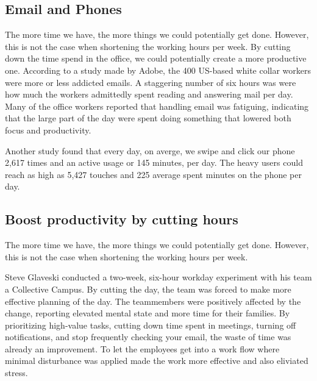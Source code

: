 \documentclass[12pt, a4paper]{article}
\begin{document}
    \subsection{Email and Phones}
    \begin{multicols}{2}
        The more time we have, the more things we could potentially get done. However, this is not the case when shortening the working hours per week.
        By cutting down the time spend in the office, we could potentially create a more productive one. According to a study made by Adobe, the 400 US-based white collar workers were more or less addicted emails.\cite{adobemail} A staggering number of six hours was were how much the workers admittedly spent reading and answering mail per day. Many of the office workers reported that handling email was fatiguing, indicating that the large part of the day were spent doing something that lowered both focus and productivity. 

        Another study found that every day, on averge, we swipe and click our phone 2,617 times and an active usage or 145 minutes, per day.\cite{dscoutphone} The heavy users could reach as high as 5,427 touches and 225 average spent minutes on the phone per day.
    \end{multicols}
        
    \noindent{}
    \subsection{Boost productivity by cutting hours}
        The more time we have, the more things we could potentially get done. However, this is not the case when shortening the working hours per week.

    Steve Glaveski conducted a two-week, six-hour workday experiment with his team a Collective Campus.\cite{harvard6hour} By cutting the day, the team was forced to make more effective planning of the day. The teammembers were positively affected by the change, reporting elevated mental state and more time for their families. By prioritizing high-value tasks, cutting down time spent in meetings, turning off notifications, and stop frequently checking your email, the waste of time was already an improvement.
    To let the employees get into a work flow where minimal disturbance was applied made the work more effective and also eliviated stress. 
\end{document}
